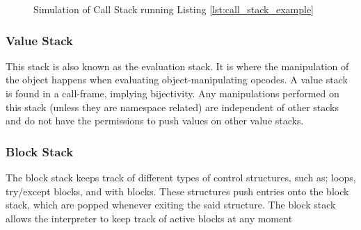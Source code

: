 {\begin{figure}

				\caption{Simulation of Call Stack running Listing \ref{lst:call_stack_example}}
				\label{fig:call_stack_example}

			\end{figure}

			\subsubsection*{Value Stack}
			\label{subsubsec:value_stack}
			\par This stack is also known as the evaluation stack. It is where the manipulation of the object happens when evaluating object-manipulating opcodes.
			A value stack is found in a call-frame, implying bijectivity. Any manipulations performed on this stack (unless they are namespace related) are independent of other stacks and
			do not have the permissions to push values on other value stacks.
			
			\subsubsection*{Block Stack}
			\label{subsubsec:block_stack}

			\par The block stack keeps track of different types of control structures, such as; loops, try/except blocks, and with blocks. These structures push entries onto the block stack, which are popped whenever exiting
			the said structure. The block stack allows the interpreter to keep track of active blocks at any moment

			\begin{figure}
				\centering


\end{figure}}
